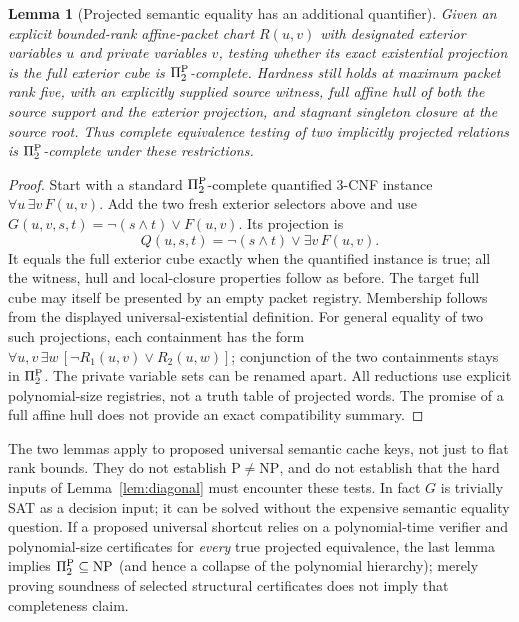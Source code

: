 \documentclass[11pt]{article}
\newtheorem{lemma}[theorem]{Lemma}
\begin{document}
\begin{lemma}[Projected semantic equality has an additional quantifier]\label{lem:dr15-project}
Given an explicit bounded-rank affine-packet chart $R(u,v)$ with designated exterior variables $u$ and private variables $v$, testing whether its exact existential projection is the full exterior cube is $\Pi_2^{\rm P}$-complete. Hardness still holds at maximum packet rank five, with an explicitly supplied source witness, full affine hull of both the source support and the exterior projection, and stagnant singleton closure at the source root. Thus complete equivalence testing of two implicitly projected relations is $\Pi_2^{\rm P}$-complete under these restrictions.
\end{lemma}
\begin{proof}
Start with a standard $\Pi_2^{\rm P}$-complete quantified 3-CNF instance $\forall u\,\exists v\,F(u,v)$. Add the two fresh exterior selectors above and use $G(u,v,s,t)=\neg(s\land t)\lor F(u,v)$. Its projection is
\[
 Q(u,s,t)=\neg(s\land t)\lor\exists v\,F(u,v).
\]
It equals the full exterior cube exactly when the quantified instance is true; all the witness, hull and local-closure properties follow as before. The target full cube may itself be presented by an empty packet registry. Membership follows from the displayed universal-existential definition. For general equality of two such projections, each containment has the form $\forall u,v\,\exists w\,[\neg R_1(u,v)\lor R_2(u,w)]$; conjunction of the two containments stays in $\Pi_2^{\rm P}$. The private variable sets can be renamed apart. All reductions use explicit polynomial-size registries, not a truth table of projected words. The promise of a full affine hull does not provide an exact compatibility summary.
\end{proof}

The two lemmas apply to proposed universal semantic cache keys, not just to flat rank bounds. They do not establish $\mathrm P\ne\mathrm{NP}$, and do not establish that the hard inputs of Lemma~\ref{lem:diagonal} must encounter these tests. In fact $G$ is trivially SAT as a decision input; it can be solved without the expensive semantic equality question. If a proposed universal shortcut relies on a polynomial-time verifier and polynomial-size certificates for \emph{every} true projected equivalence, the last lemma implies $\Pi_2^{\rm P}\subseteq\mathrm{NP}$ (and hence a collapse of the polynomial hierarchy); merely proving soundness of selected structural certificates does not imply that completeness claim.
\end{document}
